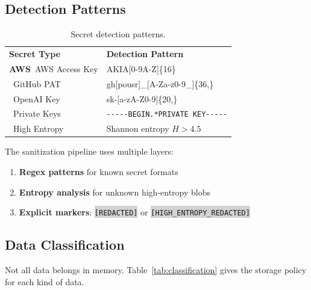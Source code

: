 \documentclass[11pt,letterpaper]{article}
\renewcommand{\arraystretch}{1.4}
\newcommand{\faAws}{\textbf{AWS}}
\newcommand{\faKey}{\ding{70}}
\newcommand{\faGithub}{\ding{70}}
\newcommand{\faRandom}{\ding{70}}
\newcommand{\faLock}{\ding{70}}
\newcommand{\code}[1]{\texttt{\small\colorbox{lightgray}{#1}}}
\begin{document}
\subsection{Detection Patterns}

\begin{table}[!htbp]
\centering
\caption{Secret detection patterns.}\label{tab:patterns}
\renewcommand{\arraystretch}{1.5}
\begin{tabular}{L{3cm} >{\ttfamily\small\raggedright\arraybackslash}p{8cm}}
\textbf{\color{white}Secret Type} & \textbf{\color{white}\textrm{Detection Pattern}} \\
\faAws\ AWS Access Key & AKIA[0-9A-Z]\{16\} \\
\faGithub\ GitHub PAT & gh[pousr]\_[A-Za-z0-9\_]\{36,\} \\
\faKey\ OpenAI Key & sk-[a-zA-Z0-9]\{20,\} \\
\faLock\ Private Keys & \texttt{-{}-{}-{}-{}-BEGIN.*PRIVATE KEY-{}-{}-{}-{}-} \\
\faRandom\ High Entropy & \textrm{Shannon entropy $H > 4.5$} \\
\bottomrule
\end{tabular}
\end{table}

\begin{tipbox}
The sanitization pipeline uses multiple layers:
\begin{enumerate}
  \item \textbf{Regex patterns} for known secret formats
  \item \textbf{Entropy analysis} for unknown high-entropy blobs
  \item \textbf{Explicit markers}: \code{[REDACTED]} or \code{[HIGH\_ENTROPY\_REDACTED]}
\end{enumerate}
\end{tipbox}

\subsection{Data Classification}

Not all data belongs in memory. Table~\ref{tab:classification} gives the storage policy for each kind of data.
\end{document}
